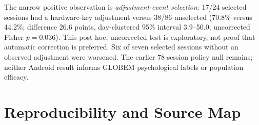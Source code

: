 \documentclass[a4paper,11pt,oneside]{report}
\begin{document}
The narrow positive observation is \emph{adjustment-event selection}: 17/24 selected
sessions had a hardware-key adjustment versus 38/86 unselected (70.8\% versus
44.2\%; difference 26.6 points, day-clustered 95\% interval 3.9--50.0;
uncorrected Fisher $p=0.036$). This post-hoc, uncorrected test is exploratory, not
proof that automatic correction is preferred. Six of seven selected sessions without
an observed adjustment were worsened. The earlier 78-session policy null remains;
neither Android result informs GLOBEM psychological labels or population efficacy.

\chapter{Reproducibility and Source Map}
\label{app:work-packages}
\end{document}
